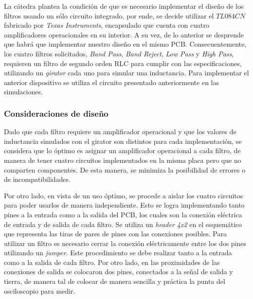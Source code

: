 La cátedra plantea la condición de que es necesario implementar el diseño de los filtros usando un sólo circuito integrado, por ende, se 
decide utilizar el $TL084CN$ fabricado por \textit{Texas Instruments},
 encapsulado que cuenta con cuatro amplificadores operacionales en su interior. A su vez, de lo anterior se desprende que habrá que implementar 
 nuestro diseño en el mismo PCB.
Consecuentemente, los cuatro filtros solicitados, \textit{Band Pass}, \textit{Band Reject}, \textit{Low Pass} y \textit{High Pass}, requieren un 
filtro de segundo orden RLC para cumplir con las especificaciones, utilizando un \textit{girator} cada uno para simular una inductancia. Para 
implementar el anterior dispositivo se utiliza el circuito presentado anteriormente en las simulaciones. \par 

\subsubsection{Consideraciones de diseño}
Dado que cada filtro requiere un amplificador operacional y que los valores de inductancia simulados con el girator son distintos para cada implementación,
se considera que lo óptimo es asignar un amplificador operacional a cada filtro, de manera de tener cuatro circuitos implementados en
 la misma placa pero que no comparten 
componentes. De esta manera, se minimiza la posibilidad de errores o de incompatibilidades. \par 

Por otro lado, en vista de un uso óptimo, se procede a aislar los cuatro circuitos para poder usarlos de manera independiente. Esto se logra implementando 
tanto pines a la entrada como a la salida del PCB, los cuales son la conexión eléctrica de entrada y de salida de cada filtro. Se utiliza un 
\textit{header 4x2} en el esquemático que representa las tiras de pares de pines con las conexiones posibles. Para utilizar un filtro es necesario cerrar
 la conexión eléctricamente entre los dos pines utilizando un \textit{jumper}. Este procedimiento se debe realizar tanto a la entrada como a la salida de 
 cada filtro.  Por otro lado, en las proximidades de las conexiones de salida se colocaron dos pines, conectados a la señal de salida y tierra,
  de manera tal de colocar de manera sencilla y práctica la punta del osciloscopio para medir.

